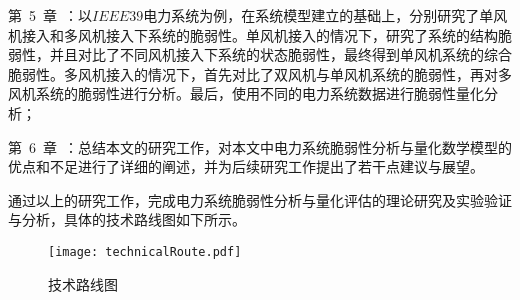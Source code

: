 第~5~章~：以$IEEE39$电力系统为例，在系统模型建立的基础上，分别研究了单风机接入和多风机接入下系统的脆弱性。单风机接入的情况下，研究了系统的结构脆弱性，并且对比了不同风机接入下系统的状态脆弱性，最终得到单风机系统的综合脆弱性。多风机接入的情况下，首先对比了双风机与单风机系统的脆弱性，再对多风机系统的脆弱性进行分析。最后，使用不同的电力系统数据进行脆弱性量化分析；

第~6~章~：总结本文的研究工作，对本文中电力系统脆弱性分析与量化数学模型的优点和不足进行了详细的阐述，并为后续研究工作提出了若干点建议与展望。

通过以上的研究工作，完成电力系统脆弱性分析与量化评估的理论研究及实验验证与分析，具体的技术路线图如下所示。
\begin{figure}[H] %
  \centering
  \texttt{[image: technicalRoute.pdf]}
  \caption{技术路线图}
  \label{fig:technicalRoute}
\end{figure}
